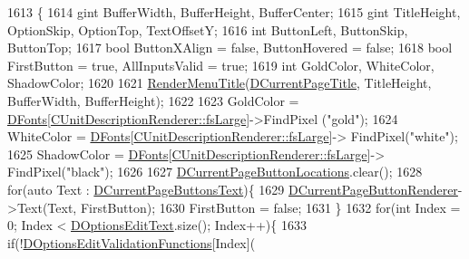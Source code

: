 \begin{DoxyCode}
1613                                             \{
1614     gint BufferWidth, BufferHeight, BufferCenter;
1615     gint TitleHeight, OptionSkip, OptionTop, TextOffsetY;
1616     \textcolor{keywordtype}{int} ButtonLeft, ButtonSkip, ButtonTop;
1617     \textcolor{keywordtype}{bool} ButtonXAlign = \textcolor{keyword}{false}, ButtonHovered = \textcolor{keyword}{false};
1618     \textcolor{keywordtype}{bool} FirstButton = \textcolor{keyword}{true}, AllInputsValid = \textcolor{keyword}{true};
1619     \textcolor{keywordtype}{int} GoldColor, WhiteColor, ShadowColor;
1620     
1621     \hyperlink{classCApplicationData_a548c5924a281c7e226fd7cac44e59920}{RenderMenuTitle}(\hyperlink{classCApplicationData_a49ce7f0b5891f0f2c29b73aad636b761}{DCurrentPageTitle}, TitleHeight, BufferWidth, 
      BufferHeight); 
1622     
1623     GoldColor = \hyperlink{classCApplicationData_afde9247d0a3ea87393ec86dcdb1e8274}{DFonts}[\hyperlink{classCUnitDescriptionRenderer_a3ea4cd83b6dd9533ab3abb953a7da35aaf467097fe4f4811a5e2f1959c86e071d}{CUnitDescriptionRenderer::fsLarge}]->FindPixel
      (\textcolor{stringliteral}{"gold"});
1624     WhiteColor = \hyperlink{classCApplicationData_afde9247d0a3ea87393ec86dcdb1e8274}{DFonts}[\hyperlink{classCUnitDescriptionRenderer_a3ea4cd83b6dd9533ab3abb953a7da35aaf467097fe4f4811a5e2f1959c86e071d}{CUnitDescriptionRenderer::fsLarge}]->
      FindPixel(\textcolor{stringliteral}{"white"});
1625     ShadowColor = \hyperlink{classCApplicationData_afde9247d0a3ea87393ec86dcdb1e8274}{DFonts}[\hyperlink{classCUnitDescriptionRenderer_a3ea4cd83b6dd9533ab3abb953a7da35aaf467097fe4f4811a5e2f1959c86e071d}{CUnitDescriptionRenderer::fsLarge}]->
      FindPixel(\textcolor{stringliteral}{"black"});
1626     
1627     \hyperlink{classCApplicationData_a3615df8e23cea3ce17f11cf61340a7b4}{DCurrentPageButtonLocations}.clear();
1628     \textcolor{keywordflow}{for}(\textcolor{keyword}{auto} Text : \hyperlink{classCApplicationData_af04b7f5f8ba4e5c99c0a3530055fc15d}{DCurrentPageButtonsText})\{
1629         \hyperlink{classCApplicationData_abfe1743f2634b069ccc811db4a8733a8}{DCurrentPageButtonRenderer}->Text(Text, FirstButton);
1630         FirstButton = \textcolor{keyword}{false};
1631     \}
1632     \textcolor{keywordflow}{for}(\textcolor{keywordtype}{int} Index = 0; Index < \hyperlink{classCApplicationData_a7044dc34cbd9d6776e8ef79eb12b5ce4}{DOptionsEditText}.size(); Index++)\{
1633         \textcolor{keywordflow}{if}(!\hyperlink{classCApplicationData_ab76fa444142de66fdb058f390e01112c}{DOptionsEditValidationFunctions}[Index](

\end{DoxyCode}
